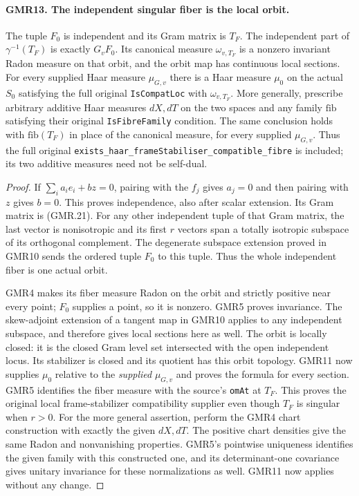 \documentclass[11pt,a4paper]{article}
\numberwithin{equation}{section}
\theoremstyle{remark}\newtheorem{remark}[theorem]{Remark}
\begin{document}
\paragraph{GMR13. The independent singular fiber is the local orbit.}
\label{claim:GMR13}
The tuple $F_0$ is independent and its Gram matrix is $T_F$.
The independent part of $\gamma^{-1}(T_F)$ is exactly $G_vF_0$.
Its canonical measure $\omega_{v,T_F}$ is a nonzero invariant Radon
measure on that orbit, and the orbit map has continuous local
sections.  For every supplied Haar measure $\mu_{G,v}$ there is a
Haar measure $\mu_0$ on the actual $S_0$ satisfying the full original
\texttt{Is\allowbreak Compat\allowbreak Loc} with $\omega_{v,T_F}$.
More generally, prescribe arbitrary additive Haar measures $dX,dT$
on the two spaces and any family $\mathrm{fib}$ satisfying their
original \texttt{Is\allowbreak Fibre\allowbreak Family} condition.  The same conclusion holds
with $\mathrm{fib}(T_F)$ in place of the canonical measure, for every
supplied $\mu_{G,v}$.  Thus the full original
\texttt{exists\_\allowbreak haar\_\allowbreak frame\allowbreak Stabiliser\_\allowbreak compatible\_\allowbreak fibre} is included;
its two additive measures need not be self-dual.

\begin{proof}
If $\sum_i a_i e_i+bz=0$, pairing with the $f_j$ gives $a_j=0$ and
then pairing with $z$ gives $b=0$.  This proves independence, also
after scalar extension.  Its Gram matrix is (GMR.21).
For any other independent tuple of that Gram matrix, the last
vector is nonisotropic and its first $r$ vectors span a totally
isotropic subspace of its orthogonal complement.  The degenerate
subspace extension proved in GMR10 sends the ordered tuple $F_0$
to this tuple.  Thus the whole independent fiber is one actual orbit.

GMR4 makes its fiber measure Radon on the orbit and strictly positive
near every point; $F_0$ supplies a point, so it is nonzero.
GMR5 proves invariance.  The skew-adjoint extension of a tangent
map in GMR10 applies to any independent subspace, and therefore
gives local sections here as well.  The orbit is locally closed:
it is the closed Gram level set intersected with the open
independent locus.  Its stabilizer is closed and its quotient has
this orbit topology.  GMR11 now supplies $\mu_0$ relative to the
\emph{supplied} $\mu_{G,v}$ and proves the formula for every section.
GMR5 identifies the fiber measure with the source's
\texttt{om\allowbreak At} at $T_F$.  This proves the original local
frame-stabilizer compatibility supplier even though $T_F$ is singular
when $r>0$.
For the more general assertion, perform the GMR4 chart construction
with exactly the given $dX,dT$.  The positive chart densities give
the same Radon and nonvanishing properties.  GMR5's pointwise
uniqueness identifies the given family with this constructed one,
and its determinant-one covariance gives unitary invariance for
these normalizations as well.  GMR11 now applies without any change.
\end{proof}
\end{document}
